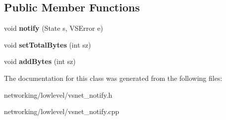 \subsection*{Public Member Functions}
\begin{DoxyCompactItemize}
\item 
void {\bfseries notify} (State s, V\+S\+Error e)\hypertarget{classVsnetDownload_1_1Client_1_1VSNotify_a9227a8c2d397600385edbeb06161d9c0}{}\label{classVsnetDownload_1_1Client_1_1VSNotify_a9227a8c2d397600385edbeb06161d9c0}

\item 
void {\bfseries set\+Total\+Bytes} (int sz)\hypertarget{classVsnetDownload_1_1Client_1_1VSNotify_a86e728af9e6cd06f24b25bbbb6210a31}{}\label{classVsnetDownload_1_1Client_1_1VSNotify_a86e728af9e6cd06f24b25bbbb6210a31}

\item 
void {\bfseries add\+Bytes} (int sz)\hypertarget{classVsnetDownload_1_1Client_1_1VSNotify_aaa4f6fb0e55b1fd5698d57e902afeb83}{}\label{classVsnetDownload_1_1Client_1_1VSNotify_aaa4f6fb0e55b1fd5698d57e902afeb83}

\end{DoxyCompactItemize}


The documentation for this class was generated from the following files\+:\begin{DoxyCompactItemize}
\item 
networking/lowlevel/vsnet\+\_\+notify.\+h\item 
networking/lowlevel/vsnet\+\_\+notify.\+cpp\end{DoxyCompactItemize}
